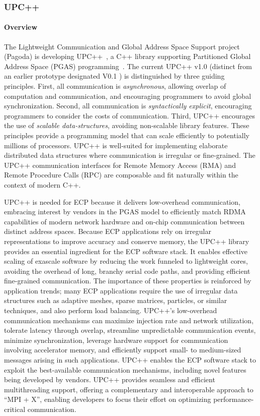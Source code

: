\subsubsection{ UPC++} 
\paragraph{Overview} 
The Lightweight Communication and Global Address Space Support project (Pagoda)
is developing UPC++~\cite{upcxx-site}, a C++ library
supporting Partitioned Global Address Space (PGAS) programming~\cite{Bachan:paw17,upcxx-spec}.
The current UPC++ v1.0 (distinct from an earlier prototype designated V0.1
\cite{zheng:ipdps14}) is distinguished by three guiding principles.
First, all communication is \emph{asynchronous}, allowing overlap of computation and
communication, and encouraging programmers to avoid global synchronization. Second, all communication
is \emph{syntactically explicit}, encouraging programmers to consider the costs of communication. Third,
UPC++ encourages the use of \emph{scalable data-structures},
avoiding non-scalable library features.
These principles provide a programming model that can
scale efficiently to potentially millions of processors.
UPC++ is well-suited for implementing elaborate distributed data structures where
communication is irregular or fine-grained. 
The UPC++ communication interfaces for Remote Memory Access (RMA) 
and Remote Procedure Calls (RPC)
are composable and fit naturally within the context of modern C++.

UPC++ is needed for ECP because it delivers low-overhead communication,
embracing interest by vendors in the PGAS model to
efficiently match RDMA capabilities of modern
network hardware and on-chip communication between distinct address
spaces.  
Because ECP applications rely on irregular representations
to improve accuracy and conserve memory, the UPC++ library provides
an essential ingredient for the ECP software stack.  It enables
effective scaling of exascale software by reducing the work funneled
to lightweight cores, avoiding the overhead of long, branchy serial
code paths, and providing efficient fine-grained communication.  The
importance of these properties is reinforced by application trends;
many ECP applications require the use of irregular data structures such as 
adaptive meshes, sparse
matrices, particles, or similar techniques, and also perform load balancing.  UPC++'s
low-overhead communication mechanisms can maximize injection rate and
network utilization, tolerate latency through overlap, streamline
unpredictable communication events, minimize synchronization,
leverage hardware support for communication involving accelerator memory,
and efficiently support small- to medium-sized messages arising in such
applications.  UPC++ enables the ECP software stack to exploit
the best-available communication mechanisms, including novel features
being developed by vendors.
UPC++ provides seamless and efficient multithreading support,
offering a complementary and
interoperable approach to ``MPI + X'', enabling developers to
focus their effort on optimizing performance-critical communication.

